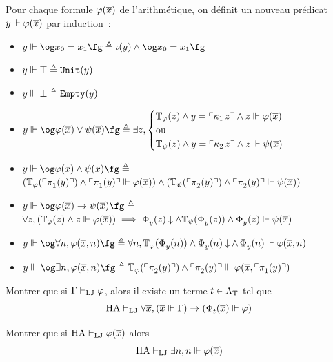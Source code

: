 \begin{problem}
  Pour chaque formule $\varphi(\overline{x})$ de l'arithmétique, on définit un nouveau
  prédicat $y \Vdash\varphi(\overline{x})$ par induction~:
  \begin{itemize}
  \item $y \real \ogM x_0 = x_1 \fgM \defeq \varTypBa(y)\land \ogM x_0=x_1 \fgM$
  \item $y \Vdash \top \triangleq {\normalfont\texttt{Unit}}(y)$
  \item $y \Vdash \bot \triangleq {\normalfont\texttt{Empty}}(y)$
  \item $y \real \ogM\varFF(\vec x) \lor \varFP(\vec x)\fgM \defeq
    \exists z,
    \begin{cases}
      \toTyST_{\varFF}(z)\land y = \godcod{\coprojP{1}{} z}\land
      z\real\varFF(\vec x)\\
      \text{ou}\\
      \toTyST_{\varFP}(z) \land y = \godcod{\coprojP{2}{} z}\land
      z\real\varFP(\vec x)
    \end{cases}$
  \item $y \real \ogM\varFF(\vec x) \land \varFP(\vec x)\fgM \defeq$\\
    $(\mathbb{T}_{\varphi}(\ulcorner\mathop{\pi_{1}^{}}(y)\urcorner)\land
    \ulcorner\mathop{\pi_{1}^{}}(y)\urcorner\Vdash\varphi(\overline{x}))
    \land
    (\mathbb{T}_{\psi}(\ulcorner\mathop{\pi_{2}^{}}(y)\urcorner)\land
    \ulcorner\mathop{\pi_{2}^{}}(y)\urcorner\Vdash\psi(\overline{x}))$
  \item $y \real \ogM \varFF(\vec x) \to \varFP(\vec x)\fgM \defeq$\\
      $\forall z, (\mathbb{T}_{\varphi}(z) \land z\Vdash \varphi(\overline{x})) \implies
      \operatorname{\Phi}_{y}^{}(z)\mathbin{\downarrow} \land \mathbb{T}_{\psi}(\operatorname{\Phi}_{y}^{}(z))\land
      \operatorname{\Phi}_{y}^{}(z)\Vdash \psi(\overline{x})$
  \item $y \real \ogM \forall n, \varFF(\vec x,n) \fgM \defeq
    \forall n, \toTyST_{\varFF}(\EnumP{y}{}(n))\land
    \EnumP{y}{}(n)\convcal\land \EnumP{y}{}(n)\real\varFF(\vec x, n)$
  \item $y \real \ogM \exists n, \varFF(\vec x,n) \fgM \defeq
    \toTyST_{\varFF}(\godcod{\projP{2}{}(y)}) \land
    \godcod{\projP{2}{}(y)}\real\varFF(\vec x,\godcod{\projP{1}{}(y)})$
  \end{itemize}
  \begin{pbQuest}[resume]
  \item Montrer que si $\Gamma\vdash_{\operatorname{LJ}}\varphi$, alors il existe un terme
    $t\in\Lambda_{\mathrm{T}}$ tel que
    \[\operatorname{HA}\vdash_{\operatorname{LJ}} \forall \overline{x}, (\overline{x} \Vdash \Gamma)
    \to (\operatorname{\Phi}_{t}^{}(\overline{x})\Vdash \varphi)\]
  \item Montrer que si $\operatorname{HA}\vdash_{\operatorname{LJ}} \varphi(\overline{x})$ alors
    \[\operatorname{HA}\vdash_{\operatorname{LJ}} \exists n, n \Vdash \varphi(\overline{x})\]
  \end{pbQuest}


\end{problem}
